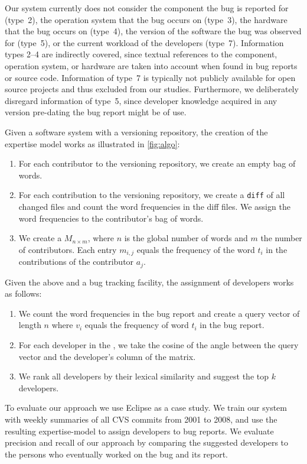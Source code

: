 \documentclass[10pt]{book}
\begin{document}
Our system currently does not consider the component the bug is reported for (type~2), the operation system that the bug occurs on (type~3), the hardware that the bug occurs on (type~4), the version of the software the bug was observed for (type~5), or the current workload of the developers (type~7). Information types 2--4 are indirectly covered, since textual references to the component, operation system, or hardware are taken into account when found in bug reports or source code. Information of type~7 is typically not publicly available for open source projects and thus excluded from our studies. Furthermore, we deliberately disregard information of type~5, since developer knowledge acquired in any version pre-dating the bug report might be of use. 

Given a software system with a versioning repository, the creation of the expertise model works as illustrated in \autoref{fig:algo}:

\begin{enumerate}
\item For each contributor to the versioning repository, we create an empty bag of words. 
\item For each contribution to the versioning repository, we create a \verb$diff$ of all changed files and count the word frequencies in the diff files. We assign the word frequencies to the contributor's bag of words.
\item We create a \TAM $M_{n \times m}$, where $n$ is the global number of words and $m$ the number of contributors. Each entry $m_{i,j}$ equals the frequency of the word $t_i$ in the contributions of the contributor $a_j$. 
\end{enumerate}

Given the above \TAM and a bug tracking facility, the assignment of developers works as follows:

\begin{enumerate}
\item We count the word frequencies in the bug report and create a query vector of length $n$ where $v_i$ equals the frequency of word $t_i$ in the bug report. 
\item For each developer in the \TAM, we take the cosine of the angle between the query vector and the developer's column of the matrix.
\item We rank all developers by their lexical similarity and suggest the top $k$ developers.
\end{enumerate}

To evaluate our approach we use Eclipse as a case study. We train our system with weekly summaries of all CVS commits from 2001 to 2008, and use the resulting expertise-model to assign developers to bug reports. We evaluate precision and recall of our approach by comparing the suggested developers to the persons who eventually worked on the bug and its report.
\end{document}
